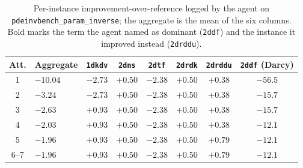 \begin{table}[t]
\centering\small
\caption{Per-instance improvement-over-reference logged by the agent on
\texttt{pdeinvbench\_param\_inverse}; the aggregate is the mean of the six
columns. Bold marks the term the agent named as dominant (\texttt{2ddf}) and the
instance it improved instead (\texttt{2drddu}).}
\label{tab:pde-agg}
\begin{tabular}{@{}clcccccc@{}}
\toprule
Att. & Aggregate & \texttt{1dkdv} & \texttt{2dns} & \texttt{2dtf} & \texttt{2drdk} & \texttt{2drddu} & \texttt{2ddf} (Darcy) \\
\midrule
1 & $-10.04$ & $-2.73$ & $+0.50$ & $-2.38$ & $+0.50$ & $+0.38$ & $\mathbf{-56.5}$ \\
2 & $-3.24$  & $-2.73$ & $+0.50$ & $-2.38$ & $+0.50$ & $+0.38$ & $-15.7$ \\
3 & $-2.63$  & $+0.93$ & $+0.50$ & $-2.38$ & $+0.50$ & $+0.38$ & $-15.7$ \\
4 & $-2.03$  & $+0.93$ & $+0.50$ & $-2.38$ & $+0.50$ & $+0.38$ & $\mathbf{-12.1}$ \\
5 & $-1.96$  & $+0.93$ & $+0.50$ & $-2.38$ & $+0.50$ & $\mathbf{+0.79}$ & $-12.1$ \\
6--7 & $-1.96$ & $+0.93$ & $+0.50$ & $-2.38$ & $+0.50$ & $+0.79$ & $-12.1$ \\
\bottomrule
\end{tabular}

\end{table}

